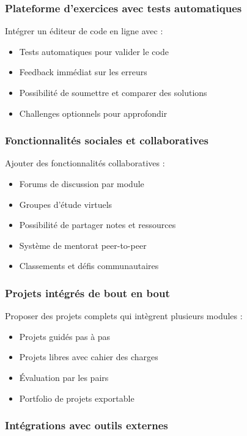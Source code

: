 \documentclass[12pt,a4paper]{article}
\begin{document}
\subsubsection{Plateforme d'exercices avec tests automatiques}

Intégrer un éditeur de code en ligne avec :
\begin{itemize}
    \item Tests automatiques pour valider le code
    \item Feedback immédiat sur les erreurs
    \item Possibilité de soumettre et comparer des solutions
    \item Challenges optionnels pour approfondir
\end{itemize}

\subsubsection{Fonctionnalités sociales et collaboratives}

Ajouter des fonctionnalités collaboratives :
\begin{itemize}
    \item Forums de discussion par module
    \item Groupes d'étude virtuels
    \item Possibilité de partager notes et ressources
    \item Système de mentorat peer-to-peer
    \item Classements et défis communautaires
\end{itemize}

\subsubsection{Projets intégrés de bout en bout}

Proposer des projets complets qui intègrent plusieurs modules :
\begin{itemize}
    \item Projets guidés pas à pas
    \item Projets libres avec cahier des charges
    \item Évaluation par les pairs
    \item Portfolio de projets exportable
\end{itemize}

\subsubsection{Intégrations avec outils externes}
\end{document}
